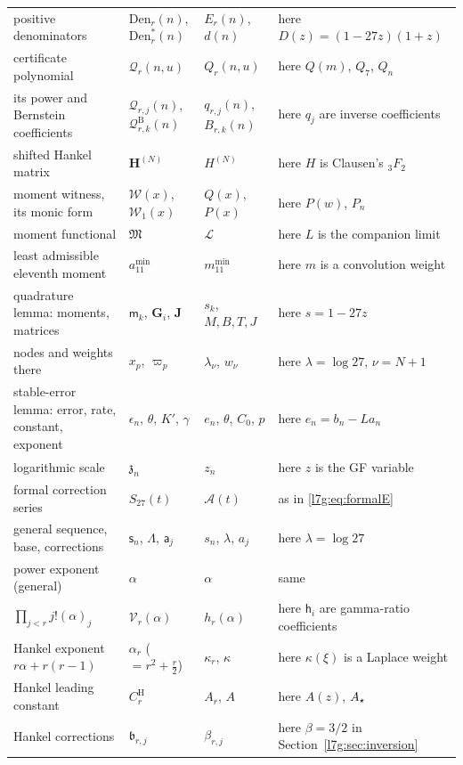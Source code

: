 \documentclass[11pt,letterpaper]{article}
\theoremstyle{remark}\newtheorem{remark}[theorem]{Remark}
\newcounter{l7gtrsavedeq}
\begin{document}
\begin{center}
\begin{longtable}{p{}p{}p{}p{}}
positive denominators & $\mathrm{Den}_r(n)$, $\mathrm{Den}^*_r(n)$ & $E_r(n)$, $d(n)$ & here $D(z)=(1-27z)(1+z)$\\
certificate polynomial & $\mathcal Q_r(n,u)$ & $Q_r(n,u)$ & here $Q(m)$, $Q_7$, $Q_n$\\
its power and Bernstein coefficients & $\mathcal Q_{r,j}(n)$, $\mathcal Q^{\mathrm B}_{r,k}(n)$ & $q_{r,j}(n)$, $B_{r,k}(n)$ & here $q_j$ are inverse coefficients\\
shifted Hankel matrix & $\mathbf H^{(N)}$ & $H^{(N)}$ & here $H$ is Clausen's ${}_3F_2$\\
moment witness, its monic form & $\mathcal W(x)$, $\mathcal W_1(x)$ & $Q(x)$, $P(x)$ & here $P(w)$, $P_n$\\
moment functional & $\mathfrak M$ & $\mathcal L$ & here $L$ is the companion limit\\
least admissible eleventh moment & $a_{11}^{\min}$ & $m_{11}^{\min}$ & here $m$ is a convolution weight\\
quadrature lemma: moments, matrices & $\mathsf m_k$, $\mathbf G_i$, $\mathbf J$ & $s_k$, $M,B,T,J$ & here $s=1-27z$\\
nodes and weights there & $x_p$, $\varpi_p$ & $\lambda_\nu$, $w_\nu$ & here $\lambda=\log27$, $\nu=N+1$\\
stable-error lemma: error, rate, constant, exponent & $\epsilon_n$, $\theta$, $K'$, $\gamma$ & $e_n$, $\theta$, $C_0$, $p$ & here $e_n=b_n-La_n$\\
logarithmic scale & $\mathfrak z_n$ & $z_n$ & here $z$ is the GF variable\\
formal correction series & $S_{27}(t)$ & $\mathcal A(t)$ & as in \eqref{l7g:eq:formalE}\\
general sequence, base, corrections & $\mathsf s_n$, $\Lambda$, $\mathsf a_j$ & $s_n$, $\lambda$, $a_j$ & here $\lambda=\log27$\\
power exponent (general) & $\alpha$ & $\alpha$ & same\\
$\prod_{j<r}j!(\alpha)_j$ & $\mathcal V_r(\alpha)$ & $h_r(\alpha)$ & here $\mathsf h_i$ are gamma-ratio coefficients\\
Hankel exponent $r\alpha+r(r-1)$ & $\alpha_r$ ($=r^2+\frac r2$) & $\kappa_r$, $\kappa$ & here $\kappa(\xi)$ is a Laplace weight\\
Hankel leading constant & $C^{\mathrm H}_r$ & $A_r$, $A$ & here $A(z)$, $A_\star$\\
Hankel corrections & $\mathfrak b_{r,j}$ & $\beta_{r,j}$ & here $\beta=3/2$ in Section~\ref{l7g:sec:inversion}\\

\end{longtable}
\end{center}
\end{document}
